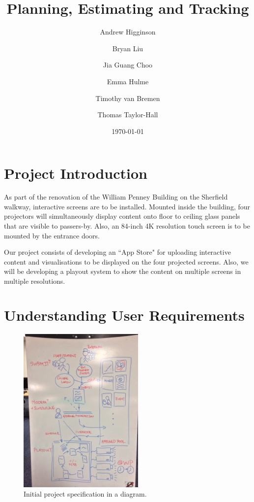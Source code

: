 \documentclass[a4paper]{article}
\begin{document}
\title{Planning, Estimating and Tracking}
\author{Andrew Higginson \and Bryan Liu \and Jia Guang Choo \and Emma Hulme \and 
Timothy van Bremen \and Thomas Taylor-Hall}
\date{\today}
\maketitle

\setcounter{table}{0}
\linespread{1.1}

\section{Project Introduction}
As part of the renovation of the William Penney Building on the Sherfield 
walkway, interactive screens are to be installed. Mounted inside the building, four projectors will simultaneously display content onto floor to ceiling glass
panels that are visible to passers-by. Also, an 84-inch 4K resolution touch 
screen is to be mounted by the entrance doors. 

Our project consists of developing an ``App Store" for uploading interactive content and visualisations to be displayed on the four projected screens. Also, we will be developing a playout system to show the content on multiple screens in multiple resolutions.



\section{Understanding User Requirements}

\begin{figure}[H]
  \centering
    \includegraphics[width = 0.55\textwidth, trim= 0 0.55cm 0 1.4cm, clip]{./planning/userreq.jpg}

  \caption{Initial project specification in a diagram.}
  \label{fig:userreq}
\end{figure}
\end{document}
